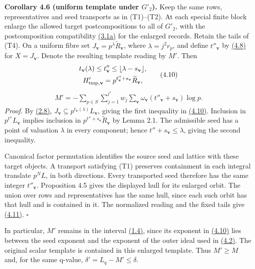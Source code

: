 \documentclass[11pt,a4paper]{amsart}
\begin{document}
\par\smallskip\noindent\textbf{Corollary 4.6 (uniform template under $G'_2$).} Keep the same rows, representatives and seed transports as in (T1)--(T2). At each special finite block enlarge the allowed target postcompositions to all of $G'_2$, with the postcomposition compatibility \hyperref[eq:3.1a]{(3.1a)} for the enlarged records. Retain the tails of (T4). On a uniform fibre set $J_{\mathbf v}=p^\lambda\widetilde R_{\mathbf v}$, where $\lambda=j^2r_p$, and define $t''_{\mathbf v}$ by \hyperref[eq:4.8]{(4.8)} for $X=J_{\mathbf v}$. Denote the resulting template reading by $M'$. Then
\begin{equation}
\begin{gathered}
t_{\mathbf v}(\lambda)\le t''_{\mathbf v}\le\lfloor\lambda-s_{\mathbf v}\rfloor,\\
H'_{\rm tmp,\mathbf v}=p^{t''_{\mathbf v}+s_{\mathbf v}}\widetilde R_{\mathbf v},
\end{gathered}
\tag{4.10}\label{eq:4.10}
\end{equation}
\begin{equation}
\begin{gathered}
M'=-\sum_{p\in S}\sum_{j=1}^{l^*}w_j\sum_{\mathbf v}\omega_{\mathbf v}
(t''_{\mathbf v}+s_{\mathbf v})\log p.
\end{gathered}
\tag{4.11}\label{eq:4.11}
\end{equation}
\emph{Proof.} By \hyperref[eq:2.8]{(2.8)}, $J_{\mathbf v}\subseteq p^{t_{\mathbf v}(\lambda)}L_{\mathbf v}$, giving the first inequality in \hyperref[eq:4.10]{(4.10)}. Inclusion in $p^{t''}L_{\mathbf v}$ implies inclusion in $p^{t''+s_{\mathbf v}}\widetilde R_{\mathbf v}$ by Lemma 2.1. The admissible seed has a point of valuation $\lambda$ in every component; hence $t''+s_{\mathbf v}\le\lambda$, giving the second inequality.


Canonical factor permutation identifies the source seed and lattice with these target objects. A transport satisfying (T1) preserves containment in each integral translate $p^N L$, in both directions. Every transported seed therefore has the same integer $t''_{\mathbf v}$. Proposition 4.5 gives the displayed hull for its enlarged orbit. The union over rows and representatives has the same hull, since each such orbit has that hull and is contained in it. The normalized reading and the fixed tails give \hyperref[eq:4.11]{(4.11)}. \hfill$\square$


In particular, $M'$ remains in the interval \hyperref[eq:1.4]{(1.4)}, since its exponent in \hyperref[eq:4.10]{(4.10)} lies between the seed exponent and the exponent of the outer ideal used in \hyperref[eq:4.2]{(4.2)}. The original scalar template is contained in this enlarged template. Thus $M'\ge M$ and, for the same q-value, $\delta'=L_q-M'\le\delta$.
\end{document}
